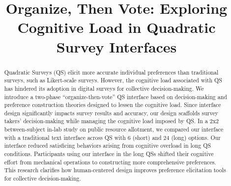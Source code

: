 \documentclass[manuscript, review, anonymous, natbib=false]{acmart}
\begin{document}

\title{Organize, Then Vote: Exploring Cognitive Load in Quadratic Survey Interfaces}











\renewcommand{\shortauthors}{Ti-Chung Cheng et al.}

\begin{abstract}
Quadratic Surveys (QS) elicit more accurate individual preferences than traditional surveys, such as Likert-scale surveys. However, the cognitive load associated with QS has hindered its adoption in digital surveys for collective decision-making. We introduce a two-phase ``organize-then-vote'' QS interface based on decision-making and preference construction theories designed to lessen the cognitive load. Since interface design significantly impacts survey results and accuracy, our design scaffolds survey takers' decision-making while managing the cognitive load imposed by QS. In a 2x2 between-subject in-lab study on public resource allotment, we compared our interface with a traditional text interface across QS with $6$ (short) and $24$ (long) options. Our interface reduced satisficing behaviors arising from cognitive overload in long QS conditions. Participants using our interface in the long QSs shifted their cognitive effort from mechanical operations to constructing more comprehensive preferences. This research clarifies how human-centered design improves preference elicitation tools for collective decision-making.
\end{abstract}
\end{document}
